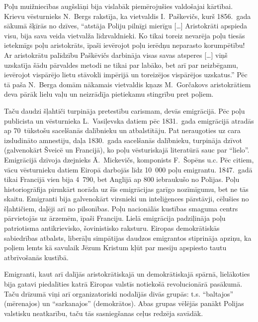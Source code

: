 \documentclass[twoside,a5paper,12pt,fleqn,openany]{extbook}
\newcommand{\citespace}{[\dots{}]}
\begin{document}
Poļu muižniecības augšslāņi bija vislabāk piemērojušies valdošajai kārtībai. Krievu vēsturnieks N.~Bergs rakstīja, ka vietvaldis I.~Paškevičs, kurš 1856.~gada sākumā šķīrās no dzīves, ``atstāja Poliju pilnīgi mierīgu \citespace{} Aristokrāti apspieda visu, bija sava veida vietvalža līdzvaldnieki. Ko tikai toreiz nevarēja poļu tiesās ietekmīgs poļu aristokrāts, īpaši ievērojot poļu ierēdņu neparasto korumpētību! Ar aristokrātu palīdzību Paškēvičs darbināja visas savas atsperes \citespace{} viņš uzskatīja šādu pārvaldes metodi ne tikai par labāko, bet arī par neizbēgamu, ievērojot vispārējo lietu stāvokli impērijā un toreizējos vispārējos uzskatus.'' Pēc tā paša N.~Berga domām nākamais vietvaldis kņazs M.~Gorčakovs aristokrātiem deva pārāk lielu vaļu un neizrādīja pietiekamu stingrību pret poļiem.

Taču daudzi šļahtiči turpināja pretestību carismam, devās emigrācijā. Pēc poļu publicista un vēsturnieka L.~Vasiļevska datiem pēc 1831.~gada emigrācijā atradās ap 70~tūkstošu sacelšanās dalībnieku un atbalstītāju. Pat neraugoties uz cara izsludināto amnestiju, daļa 1830.~gada sacelšanās dalībnieku, turpināja dzīvot  (galvenokārt Šveicē un Francijā), ko poļu vēsturiskajā literatūrā sauc par ``lielo''. Emigrācijā dzīvoja dzejnieks Ā.~Mickevičs, komponists F.~Šopēns u.c. Pēc citiem, vācu vēsturnieku datiem Eiropā darbojās līdz 10~000 poļu emigrantu. 1847.~gadā tikai Francijā vien bija 4~790, bet Anglijā ap 800 iebraukušo no Polijas. Poļu historiogrāfija pirmkārt norāda uz šīs emigrācijas garīgo nozīmīgumu, bet ne tās skaitu. Emigranti bija galvenokārt virsnieki un inteliģences pārstāvji, cēlušies no šļahtičiem, daļēji arī no pilsonības. Poļu nacionālās kustības smaguma centrs pārvietojās uz ārzemēm, īpaši Franciju. Lielā emigrācija padziļināja poļu patriotisma antikrievisko, šovinistisko raksturu. Eiropas demokrātiskās sabiedrības atbalsts, liberāļu simpātijas daudzos emigrantos stiprināja apziņu, ka poļiem lemts kā savulaik Jēzum Kristum kļūt par mesiju apspiesto tautu atbrīvošanās kustībā.

Emigranti, kaut arī dalījās aristokrātiskajā un demokrātiskajā spārnā, lielākoties bija gatavi piedalīties katrā Eiropas valstīs notiekošā revolucionārā pasākumā. Taču drīzumā viņi arī organizatoriski nodalījās divās grupās: t.s. ``baltajos'' (mērenajos) un ``sarkanajos'' (demokrātos). Abas grupas vēlējās panākt Polijas valstisku neatkarību, taču tās sasniegšanas ceļus redzēja savādāk.
\end{document}
